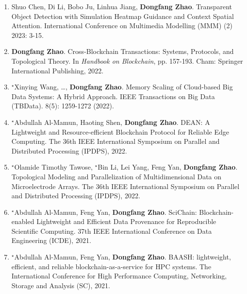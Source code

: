 \documentclass[11pt,]{scrartcl}
\begin{document}
\begin{enumerate}
\item Shuo Chen, Di Li, Bobo Ju, Linhua Jiang, \textbf{Dongfang Zhao}.
Transparent Object Detection with Simulation Heatmap Guidance and Context Spatial Attention. International Conference on Multimedia Modelling (MMM) (2) 2023: 3-15.

\item \textbf{Dongfang Zhao}. 
Cross-Blockchain Transactions: Systems, Protocols, and Topological Theory.
In \textit{Handbook on Blockchain}, pp. 157-193. 
Cham: Springer International Publishing, 2022.


\item $^\star$Xinying Wang, \dots, \textbf{Dongfang Zhao}. 
Memory Scaling of Cloud-based Big Data Systems: A Hybrid Approach.
IEEE Transactions on Big Data (TBData). 8(5): 1259-1272 (2022).

\item 	$^\star$Abdullah Al-Mamun, Haoting Shen, \textbf{Dongfang Zhao}.
DEAN: A Lightweight and Resource-efficient Blockchain Protocol for Reliable Edge Computing. 
The 36th IEEE International Symposium on Parallel and Distributed Processing (IPDPS), 2022.

\item 	$^\star$Olamide Timothy Tawose, $^\star$Bin Li, Lei Yang, Feng Yan, \textbf{Dongfang Zhao}.
Topological Modeling and Parallelization of Multidimensional Data on Microelectrode Arrays. 
The 36th IEEE International Symposium on Parallel and Distributed Processing (IPDPS), 2022.

\item $^\star$Abdullah Al-Mamun, Feng Yan, \textbf{Dongfang Zhao}.
SciChain: Blockchain-enabled Lightweight and Efficient Data Provenance for Reproducible Scientific Computing. 37th IEEE International Conference on Data Engineering (ICDE), 2021.

\item $^\star$Abdullah Al-Mamun, Feng Yan, \textbf{Dongfang Zhao}.
BAASH: lightweight, efficient, and reliable blockchain-as-a-service for HPC systems. The International Conference for High Performance Computing, Networking, Storage and Analysis (SC), 2021.


\end{enumerate}
\end{document}
